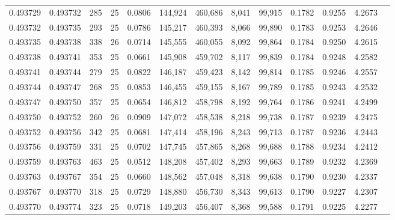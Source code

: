 \begin{tabular}{rrrrrrrrrrrrr}
0.493729 & 0.493732 &   285 &  25 &                                     0.0806 & 144,924 & 460,686 &   8,041 &  99,915 & 0.1782 & 0.9255 & 4.2673 \\
0.493732 & 0.493735 &   293 &  25 &                                     0.0786 & 145,217 & 460,393 &   8,066 &  99,890 & 0.1783 & 0.9253 & 4.2646 \\
0.493735 & 0.493738 &   338 &  26 &                                     0.0714 & 145,555 & 460,055 &   8,092 &  99,864 & 0.1784 & 0.9250 & 4.2615 \\
0.493738 & 0.493741 &   353 &  25 &                                     0.0661 & 145,908 & 459,702 &   8,117 &  99,839 & 0.1784 & 0.9248 & 4.2582 \\
0.493741 & 0.493744 &   279 &  25 &                                     0.0822 & 146,187 & 459,423 &   8,142 &  99,814 & 0.1785 & 0.9246 & 4.2557 \\
0.493744 & 0.493747 &   268 &  25 &                                     0.0853 & 146,455 & 459,155 &   8,167 &  99,789 & 0.1785 & 0.9243 & 4.2532 \\
0.493747 & 0.493750 &   357 &  25 &                                     0.0654 & 146,812 & 458,798 &   8,192 &  99,764 & 0.1786 & 0.9241 & 4.2499 \\
0.493750 & 0.493752 &   260 &  26 &                                     0.0909 & 147,072 & 458,538 &   8,218 &  99,738 & 0.1787 & 0.9239 & 4.2475 \\
0.493752 & 0.493756 &   342 &  25 &                                     0.0681 & 147,414 & 458,196 &   8,243 &  99,713 & 0.1787 & 0.9236 & 4.2443 \\
0.493756 & 0.493759 &   331 &  25 &                                     0.0702 & 147,745 & 457,865 &   8,268 &  99,688 & 0.1788 & 0.9234 & 4.2412 \\
0.493759 & 0.493763 &   463 &  25 &                                     0.0512 & 148,208 & 457,402 &   8,293 &  99,663 & 0.1789 & 0.9232 & 4.2369 \\
0.493763 & 0.493767 &   354 &  25 &                                     0.0660 & 148,562 & 457,048 &   8,318 &  99,638 & 0.1790 & 0.9230 & 4.2337 \\
0.493767 & 0.493770 &   318 &  25 &                                     0.0729 & 148,880 & 456,730 &   8,343 &  99,613 & 0.1790 & 0.9227 & 4.2307 \\
0.493770 & 0.493774 &   323 &  25 &                                     0.0718 & 149,203 & 456,407 &   8,368 &  99,588 & 0.1791 & 0.9225 & 4.2277 \\

\end{tabular}
